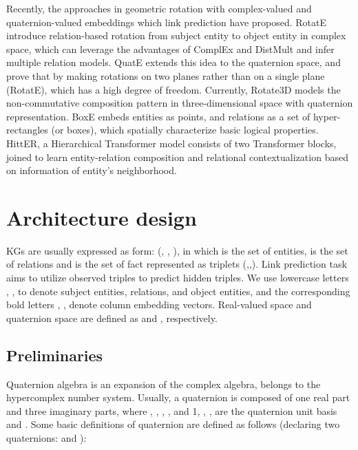 \documentclass[letterpaper]{article} \usepackage{aaai20}  \usepackage{times}  \usepackage{helvet} \usepackage{courier}  \usepackage[hyphens]{url}  \usepackage{graphicx} \usepackage{lineno,hyperref,amsmath,amssymb}
\begin{document}
Recently, the approaches in geometric rotation with complex-valued and quaternion-valued embeddings which link prediction have proposed. RotatE\cite{sun2019rotate} introduce relation-based rotation from subject entity to object entity in complex space, which can leverage the advantages of ComplEx\cite{trouillon2016complex} and DistMult\cite{yang2014embedding} and infer multiple relation models. QuatE\cite{zhang2019quaternion} extends this idea to the quaternion space, and prove that by making rotations on two planes rather than on a single plane (RotatE), which has a high degree of freedom. Currently, Rotate3D\cite{gao2020rotate3d} models the non-commutative composition pattern in three-dimensional space with quaternion representation. BoxE\cite{abboud2020boxe} embeds entities as points, and relations as a set of hyper-rectangles (or boxes), which spatially characterize basic logical properties. HittER\cite{chen2020hitter}, a Hierarchical Transformer model consists of two Transformer blocks, joined to learn entity-relation composition and relational contextualization based on information of entity’s neighborhood.

\section{Architecture design }

KGs are usually expressed as form: (, , ), in which  is the set of entities,  is the set of relations and  is the set of fact represented as triplets (,,). Link prediction task aims to utilize observed triples to predict hidden triples. We use lowercase letters , ,  to denote subject entities, relations, and object entities, and the corresponding bold letters , ,   denote column embedding vectors. Real-valued space and quaternion space are defined as  and , respectively.

\subsection{Preliminaries}
Quaternion algebra\cite{hamilton1844lxxviii} is an expansion of the complex algebra, belongs to the hypercomplex number system. Usually, a quaternion  is composed of one real part and three imaginary parts, where , , , , and 1, , ,  are the quaternion unit basis and . Some basic definitions of quaternion are defined as follows (declaring two quaternions:  and ):
\end{document}
